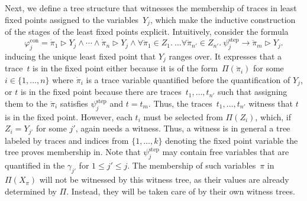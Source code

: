 \documentclass[dvipsnames,10pt,a4paper]{amsart}
\theoremstyle{definition}
\theoremstyle{remark}
\renewcommand{\phi}{\varphi}
\newcommand{\set}[1]{\{#1\}}
\newcommand{\con}{\mathrm{con}}
\newcommand{\step}{\mathrm{step}}
\newcommand{\tracein}{\mathrel{\triangleright}}
\newcommand{\overdot}[1]{\dot{#1}}
\newcommand{\overdotdot}[1]{\ddot{#1}}
\begin{document}
Next, we define a tree structure that witnesses the membership of traces in least fixed points assigned to the variables~$Y_j$, which make the inductive construction of the stages of the least fixed points explicit.
Intuitively, consider the formula
\begin{equation}
\label{eq_phicon}
\phi_j^\con = \overdot{\pi}_1\tracein Y_j \wedge \cdots \wedge \overdot{\pi}_n \tracein Y_j \wedge   \forall \overdotdot{\pi}_1 \in Z_1.\ \ldots \forall \overdotdot{\pi}_{n'} \in Z_{n'}.\ \psi^\step_j \rightarrow \overdotdot{\pi}_m \tracein Y_j.    
\end{equation}
inducing the unique least fixed point that $Y_j$ ranges over. 
It expresses that a trace~$t$ is in the fixed point either because it is of the form~$\Pi(\overdot{\pi}_i)$ for some $i \in \set{1,\ldots, n}$ where $\overdot{\pi}_i$ is a trace variable quantified before the quantification of $Y_j$, or $t$ is in the fixed point because there are traces~$t_1,\ldots, t_{n'}$ such that assigning them to the $\overdotdot{\pi}_i$ satisfies $\psi^\step_j$ and $t = t_m$. 
Thus, the traces~$t_1,\ldots, t_{n'}$ witness that $t$ is in the fixed point. 
However, each $t_i$ must be selected from $\Pi(Z_i)$, which, if $Z_i = Y_{j'}$ for some $j'$, again needs a witness.
Thus, a witness is in general a tree labeled by traces and indices from $\set{1, \ldots, k}$ denoting the fixed point variable the tree proves membership in.
Note that $\psi^\step_j$ may contain free variables that are quantified in the $\gamma_{j'}$ for $1 \le j' \le j$. 
The membership of such variables~$\pi$ in $\Pi(X_\pi)$ will not be witnessed by this witness tree, as their values are already determined by $\Pi$.
Instead, they will be taken care of by their own witness trees.
\end{document}
